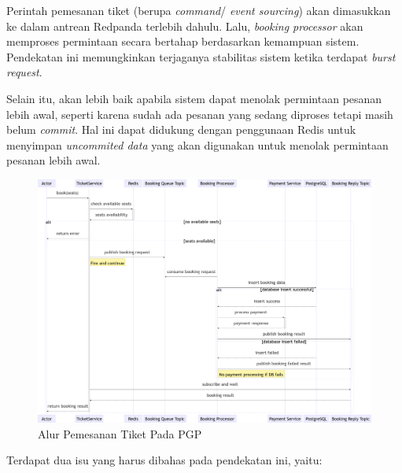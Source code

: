 Perintah pemesanan tiket (berupa \textit{command}/ \textit{event sourcing}) akan dimasukkan ke dalam antrean Redpanda terlebih dahulu. Lalu, \textit{booking processor} akan memproses permintaan secara bertahap berdasarkan kemampuan sistem. Pendekatan ini memungkinkan terjaganya stabilitas sistem ketika terdapat \textit{burst request}.

Selain itu, akan lebih baik apabila sistem dapat menolak permintaan pesanan lebih awal, seperti karena sudah ada pesanan yang sedang diproses tetapi masih belum \textit{commit}. Hal ini dapat didukung dengan penggunaan Redis untuk menyimpan \textit{uncommited data} yang akan digunakan untuk menolak permintaan pesanan lebih awal.

\begin{figure}[htbp]
    \centering
    \includegraphics[width=1\textwidth]{resources/appendix/pgp-purchase-flow.png}
    \caption{Alur Pemesanan Tiket Pada PGP}
    \label{fig:pgp-purchase-flow}
\end{figure}

Terdapat dua isu yang harus dibahas pada pendekatan ini, yaitu:

